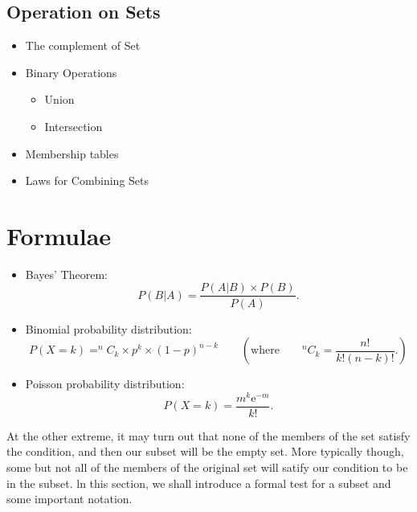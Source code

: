 {{{\subsection*{Operation on Sets}

\begin{itemize}
\item The complement of Set
\item Binary Operations
\begin{itemize}
\item Union
\item Intersection
\end{itemize}
\item Membership tables
\item Laws for Combining Sets
\end{itemize}


\newpage
\section*{Formulae}
\begin{itemize}




\item Bayes' Theorem:
\begin{equation*}
P(B|A)=\frac{P\left(A|B\right) \times P(B) }{P\left( A\right) }.
\end{equation*}



\item Binomial probability distribution:
\begin{equation*}
P(X = k) = ^{n}C_{k} \times p^{k} \times \left( 1-p\right) ^{n-k}\qquad \left( \text{where}\qquad
^{n}C_{k} =\frac{n!}{k!\left(n-k\right) !}. \right)
\end{equation*}

\item Poisson probability distribution:
\begin{equation*}
P(X = k) =\frac{m^{k}\mathrm{e}^{-m}}{k!}.
\end{equation*}
\end{itemize}

 
\smallskip 
\smallskip 
At the other extreme, it may turn out that none of the members
of the set satisfy the condition, and then our subset will be the empty set. More typically though,
some but not all of the members of the original set will satify our condition to be in the subset.
ln this section, we shall introduce a formal test for a subset and some important notation.

}}}
